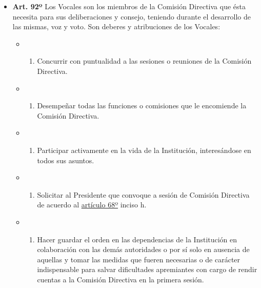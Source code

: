 \documentclass[openany]{book}
\providecommand{\tightlist}{%
  \setlength{\itemsep}{0pt}\setlength{\parskip}{0pt}}
\begin{document}
\begin{itemize}
\tightlist
\item
  \textbf{Art. 92º}
  Los Vocales son los miembros de la Comisión Directiva que ésta necesita para sus deliberaciones y consejo, teniendo durante el desarrollo de las mismas, voz y voto. Son deberes y atribuciones de los Vocales:

  \begin{itemize}
  \item
    \begin{enumerate}
    \def\labelenumi{\alph{enumi})}
    \tightlist
    \item
      Concurrir con puntualidad a las sesiones o reuniones de la Comisión Directiva.
    \end{enumerate}
  \item
    \begin{enumerate}
    \def\labelenumi{\alph{enumi})}
    \setcounter{enumi}{1}
    \tightlist
    \item
      Desempeñar todas las funciones o comisiones que le encomiende la Comisión Directiva.
    \end{enumerate}
  \item
    \begin{enumerate}
    \def\labelenumi{\alph{enumi})}
    \setcounter{enumi}{2}
    \tightlist
    \item
      Participar activamente en la vida de la Institución, interesándose en todos sus asuntos.
    \end{enumerate}
  \item
    \begin{enumerate}
    \def\labelenumi{\alph{enumi})}
    \setcounter{enumi}{3}
    \tightlist
    \item
      Solicitar al Presidente que convoque a sesión de Comisión Directiva de acuerdo al \protect\hyperlink{art68}{artículo 68º} inciso h.
    \end{enumerate}
  \item
    \begin{enumerate}
    \def\labelenumi{\alph{enumi})}
    \setcounter{enumi}{4}
    \tightlist
    \item
      Hacer guardar el orden en las dependencias de la Institución en colaboración con las demás autoridades o por sí solo en ausencia de aquellas y tomar las medidas que fueren necesarias o de carácter indispensable para salvar dificultades apremiantes con cargo de rendir cuentas a la Comisión Directiva en la primera sesión.
    \end{enumerate}

\end{itemize}
\end{itemize}
\end{document}
